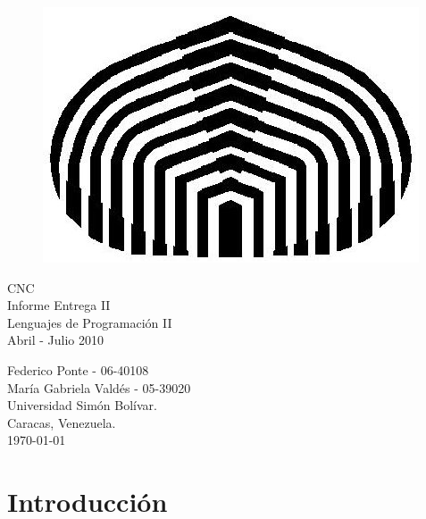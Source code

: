 \documentclass[11pt, spanish]{report}
\begin{document}
\begin{titlepage}

  \begin{figure}[htp]
    \centering
    \mbox{\includegraphics[scale=0.3]{cebolla.jpg}}
  \end{figure}
  
  \vspace*{2.0cm}
  \begin{center}
    {\Huge CNC\\} 
    {\LARGE Informe Entrega II\\}
    {\Large Lenguajes de Programaci\'on II \\ Abril - Julio 2010\\}
    \vspace{3.0cm}
    
    Federico Ponte - 06-40108\\
    Mar\'ia Gabriela Vald\'es - 05-39020\\
    
    \vspace*{2.0cm}
    Universidad Sim\'on Bol\'ivar.\\
    Caracas, Venezuela.\\
    \today
  \end{center}
  
\end{titlepage}

\newpage

\tableofcontents

\listoffigures

\newpage

\chapter{Introducci\'on}
\end{document}
